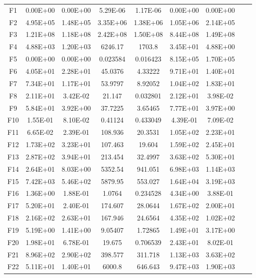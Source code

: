 \begin{table*}[htbp]
\begin{tabular}{|c|cc|cc|cc|cc|}
   \cline{1-7}
    F1    & 0.00E+00 & 0.00E+00 & 5.29E-06 & 1.17E-06 & 0.00E+00 & 0.00E+00 \\
    F2    & 4.95E+05 & 1.48E+05 & 3.35E+06 & 1.38E+06 & 1.05E+06 & 2.14E+05 \\
    F3    & 1.21E+08 & 1.18E+08 & 2.42E+08 & 1.50E+08 & 8.44E+08 & 1.49E+08 \\
    F4    & 4.88E+03 & 1.20E+03 & 6246.17 & 1703.8 & 3.45E+01 & 4.88E+00 \\
    F5    & 0.00E+00 & 0.00E+00 & 0.023584 & 0.016423 & 8.15E+05 & 1.70E+05 \\
    \cline{1-7}
    F6    & 4.05E+01 & 2.28E+01 & 45.0376 & 4.33222 & 9.71E+01 & 1.40E+01 \\
    F7    & 7.34E+01 & 1.17E+01 & 53.9797 & 8.92052 & 1.04E+02 & 1.83E+01 \\
    F8    & 2.11E+01 & 3.42E-02 & 21.147 & 0.032801 & 2.12E+01 & 3.98E-02 \\
    F9    & 5.84E+01 & 3.92E+00 & 37.7225 & 3.65465 & 7.77E+01 & 3.97E+00 \\
    F10   & 1.55E-01 & 8.10E-02 & 0.41124 & 0.433049 & 4.39E-01 & 7.09E-02 \\
    F11   & 6.65E-02 & 2.39E-01 & 108.936 & 20.3531 & 1.05E+02 & 2.23E+01 \\
    F12   & 1.73E+02 & 3.23E+01 & 107.463 & 19.604 & 1.59E+02 & 2.45E+01 \\
    F13   & 2.87E+02 & 3.94E+01 & 213.454 & 32.4997 & 3.63E+02 & 5.30E+01 \\
    F14   & 2.64E+01 & 8.03E+00 & 5352.54 & 941.051 & 6.98E+03 & 1.14E+03 \\
    F15   & 7.42E+03 & 5.46E+02 & 5879.95 & 553.027 & 1.64E+04 & 3.19E+03 \\
    F16   & 1.36E+00 & 1.88E-01 & 1.0764 & 0.234528 & 4.34E+00 & 3.88E-01 \\
    F17   & 5.20E+01 & 2.40E-01 & 174.607 & 28.0644 & 1.67E+02 & 2.00E+01 \\
    F18   & 2.16E+02 & 2.63E+01 & 167.946 & 24.6564 & 4.35E+02 & 1.02E+02 \\
    F19   & 5.19E+00 & 1.41E+00 & 9.05407 & 1.72865 & 1.49E+01 & 3.17E+00 \\
    F20   & 1.98E+01 & 6.78E-01 & 19.675 & 0.706539 & 2.43E+01 & 8.02E-01 \\
    \cline{1-7}
    F21   & 8.96E+02 & 2.90E+02 & 398.577 & 311.718 & 1.13E+03 & 3.63E+02 \\
    F22   & 5.11E+01 & 1.40E+01 & 6000.8 & 646.643 & 9.47E+03 & 1.90E+03 \\

\end{tabular}
\end{table*}
